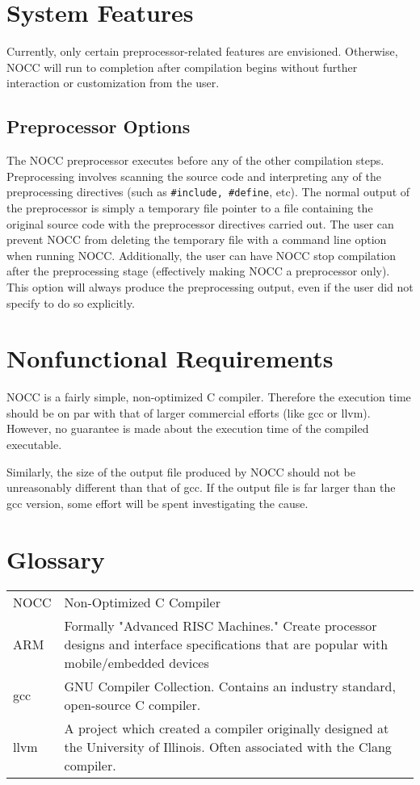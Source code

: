 \documentclass{article}
\begin{document}
\section{System Features}
Currently, only certain preprocessor-related features are envisioned.  
Otherwise, NOCC will run to completion after compilation begins without further interaction or customization from the user.

\subsection{Preprocessor Options}
The NOCC preprocessor executes before any of the other compilation steps.  
Preprocessing involves scanning the source code and interpreting any of the preprocessing directives (such as \texttt{\#include, \#define}, etc).
The normal output of the preprocessor is simply a temporary file pointer to a file containing the original source code with the preprocessor directives carried out.
The user can prevent NOCC from deleting the temporary file with a command line option when running NOCC.
Additionally, the user can have NOCC stop compilation after the preprocessing stage (effectively making NOCC a preprocessor only).
This option will always produce the preprocessing output, even if the user did not specify to do so explicitly.

\section{Nonfunctional Requirements}
NOCC is a fairly simple, non-optimized C compiler.  
Therefore the execution time should be on par with that of larger commercial efforts (like gcc or llvm).
However, no guarantee is made about the execution time of the compiled executable.

Similarly, the size of the output file produced by NOCC should not be unreasonably different than that of gcc.
If the output file is far larger than the gcc version, some effort will be spent investigating the cause.

\section{Glossary}
\begin{tabular}{l p{12cm}}
NOCC & Non-Optimized C Compiler \\
ARM & Formally "Advanced RISC Machines."  Create processor designs and interface specifications that are popular with mobile/embedded devices \\
gcc & GNU Compiler Collection.  Contains an industry standard, open-source C compiler.\\
llvm & A project which created a compiler originally designed at the University of Illinois.  Often associated with the Clang compiler.
\end{tabular}
\end{document}
